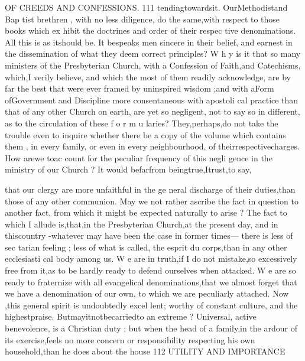 \documentclass[
]{book}
\begin{document}
OF CREEDS AND CONFESSIONS. 111
tendingtowardsit. OurMethodistand Bap tist brethren , with no less diligence, do the same,with respect to those books which ex hibit the doctrines and order of their respec tive denominations. All this is as itshould be. It bespeaks men sincere in their belief,
and earnest in the dissemination of what they
deem correct principles? W h y is it that so
many ministers of the Presbyterian Church,
with a Confession of Faith,and Catechisms, which,I verily believe, and which the most
of them readily acknowledge, are by far the best that were ever framed by uninspired wisdom ;and with aForm ofGovernment and Discipline more consentaneous with apostoli
cal practice than that of any other Church on
earth, are yet so negligent, not to say so in different, as to the circulation of these f o r m u
laries? They,perhaps,do not take the trouble
even to inquire whether there be a copy of the volume which contains them , in every
family, or even in every neighbourhood, of theirrespectivecharges. How arewe toac count for the peculiar frequency of this negli
gence in the ministry of our Church ? It would befarfrom beingtrue,Itrust,to say,

that our clergy are more unfaithful in the ge neral discharge of their duties,than those of any other communion. May we not rather ascribe the fact in question to another fact, from which it might be expected naturally to arise ? The fact to which I allude is,that,in
the Presbyterian Church,at the present day, and in thiscountry -whatever may have been the case in former times--- there is less of sec
tarian feeling ; less of what is called, the esprit du corps,than in any other ecclesiasti cal body among us. W e are in truth,if I do not mistake,so excessively free from it,as to be hardly ready to defend ourselves when attacked. W e are so ready to fraternize with all evangelical denominations,that we almost forget that we have a denomination of our own, to which we are peculiarly attached. Now ,this general spirit is undoubtedly excel lent; worthy of constant culture, and the highestpraise. Butmayitnotbecarriedto an extreme ? Universal, active benevolence, is a Christian duty ; but when the head of a family,in the ardour of its exercise,feels no more concern or responsibility respecting his own household,than he does about the house
112 UTILITY AND IMPORTANCE
\end{document}
